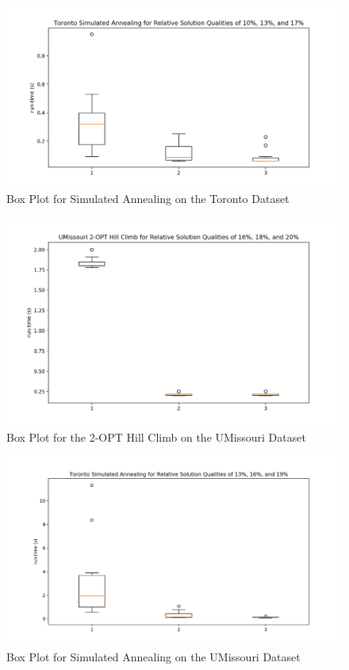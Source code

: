 \documentclass[format=sigconf]{acmart}
\begin{document}
\begin{figure}[htbp]
    \centerline{\includegraphics[scale=.5]{graphs/Toronto_LS2_Box.png}}
    \caption{Box Plot for Simulated Annealing on the Toronto Dataset}
    \label{fig10}
\end{figure}

\begin{figure}[htbp]
    \centerline{\includegraphics[scale=.5]{graphs/UMissouri_LS1_Box.png}}
    \caption{Box Plot for the 2-OPT Hill Climb on the UMissouri Dataset}
    \label{fig11}
\end{figure}

\begin{figure}[htbp]
    \centerline{\includegraphics[scale=.5]{graphs/UMissouri_LS2_Box.png}}
    \caption{Box Plot for Simulated Annealing on the UMissouri Dataset}
    \label{fig12}
\end{figure}
 \clearpage
\end{document}
